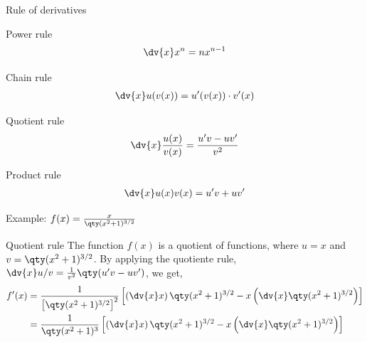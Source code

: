 \documentclass[../tufte-style.tex]{standalone}
\begin{document}
\date{February 25, 2026}

\begin{frame}{Rule of derivatives}

\begin{minipage}{0.45\textwidth}
    \centering
    \begin{block}{Power rule}
        \begin{gather*}
            \dv{x}x^{n} = nx^{n-1}
        \end{gather*}
    \end{block}
\end{minipage}
\hfill
\begin{minipage}{0.45\textwidth}
    \centering
    \begin{block}{Chain rule}
        \begin{gather*}
            \dv{x}u(v(x)) = u'(v(x))\cdot v'(x)
        \end{gather*}
    \end{block}
\end{minipage}


\begin{minipage}{0.45\textwidth}
    \centering
    \begin{block}{Quotient rule}
        \begin{gather*}
            \dv{x}\frac{u(x)}{v(x)} = \frac{u'v - uv'}{v^{2}} 
        \end{gather*}
    \end{block}
\end{minipage}
\hfill
\begin{minipage}{0.45\textwidth}
    \centering
    \begin{block}{Product rule}
        \begin{gather*}
            \dv{x}u(x)v(x) = u'v + uv'
        \end{gather*}
    \end{block}
\end{minipage}

\end{frame}

\begin{frame}{Example: \( f(x) = \frac{x}{\qty(x^{2}+1)^{3/2}} \)}

\begin{block}{Quotient rule}
The function \(f(x)\) is a quotient of functions, where \(u=x\) and \(v=\qty(x^{2}+1)^{3/2}\).
By applying the quotiente rule, \(\dv{x}u/v = \frac{1}{v^{2}}\qty(u'v - uv')\), we get,
\begin{align*}
    f'(x) &= \frac{1}{\left[\qty(x^{2}+1)^{3/2}\right]^2}
        \left[ 
            \left(\dv{x}x\right)\qty(x^{2}+1)^{3/2}
            -
            x\left(\dv{x}\qty(x^{2}+1)^{3/2}\right)
        \right] \\
          &= \frac{1}{\qty(x^{2}+1)^{3}}
        \left[ 
            \left(\dv{x}x\right)\qty(x^{2}+1)^{3/2}
            -
            x\left(\dv{x}\qty(x^{2}+1)^{3/2}\right)
        \right]
\end{align*}
\end{block}

\end{frame}
\end{document}
